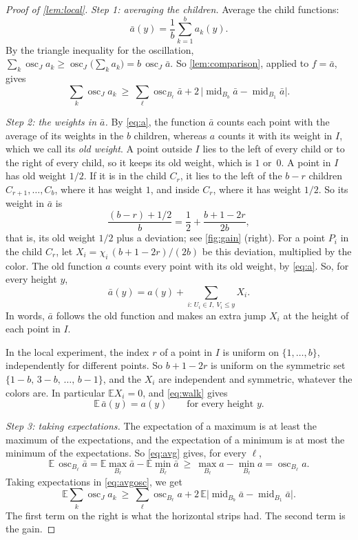\documentclass[11pt,letterpaper]{article}
\newcommand{\E}{\mathbb{E}}
\newcommand{\1}{\mathbf{1}}
\newcommand{\osc}{\operatorname{osc}}
\newcommand{\midp}{\operatorname{mid}}
\begin{document}
\begin{proof}[Proof of \cref{lem:local}]
\emph{Step 1: averaging the children.} Average the child functions:
\[
\bar a(y)=\frac1b\sum_{k=1}^ba_k(y).
\]
By the triangle inequality for the oscillation, $\sum_k\osc_Ja_k\ge\osc_J\bigl(\sum_ka_k\bigr)=b\,\osc_J\bar a$. So \cref{lem:comparison}, applied to $f=\bar a$, gives
\begin{equation}\label{eq:avgosc}
\sum_k\osc_Ja_k\ \ge\ \sum_\ell\osc_{B_\ell}\bar a+2\,\bigl|\midp_{B_b}\bar a-\midp_{B_1}\bar a\bigr|.
\end{equation}

\emph{Step 2: the weights in $\bar a$.} By \eqref{eq:a}, the function $\bar a$ counts each point with the average of its weights in the $b$ children, whereas $a$ counts it with its weight in $I$, which we call its \emph{old weight}. A point outside $I$ lies to the left of every child or to the right of every child, so it keeps its old weight, which is $1$ or~$0$. A point in $I$ has old weight $1/2$. If it is in the child $C_r$, it lies to the left of the $b-r$ children $C_{r+1},\dots,C_b$, where it has weight $1$, and inside $C_r$, where it has weight $1/2$. So its weight in $\bar a$ is
\[
\frac{(b-r)+1/2}b=\frac12+\frac{b+1-2r}{2b},
\]
that is, its old weight $1/2$ plus a deviation; see \cref{fig:gain} (right). For a point $P_i$ in the child $C_r$, let $X_i=\chi_i\,(b+1-2r)/(2b)$ be this deviation, multiplied by the color. The old function $a$ counts every point with its old weight, by \eqref{eq:a}. So, for every height $y$,
\begin{equation}\label{eq:walk}
\bar a(y)=a(y)+\sum_{i:\,U_i\in I,\ V_i\le y}X_i.
\end{equation}
In words, $\bar a$ follows the old function and makes an extra jump $X_i$ at the height of each point in $I$.

In the local experiment, the index $r$ of a point in $I$ is uniform on $\{1,\dots,b\}$, independently for different points. So $b+1-2r$ is uniform on the symmetric set $\{1-b,\,3-b,\,\dots,\,b-1\}$, and the $X_i$ are independent and symmetric, whatever the colors are. In particular $\E X_i=0$, and \eqref{eq:walk} gives
\begin{equation}\label{eq:avg}
\E\,\bar a(y)=a(y)\qquad\text{for every height }y.
\end{equation}

\emph{Step 3: taking expectations.} The expectation of a maximum is at least the maximum of the expectations, and the expectation of a minimum is at most the minimum of the expectations. So \eqref{eq:avg} gives, for every $\ell$,
\[
\E\,\osc_{B_\ell}\bar a=\E\max_{B_\ell}\bar a-\E\min_{B_\ell}\bar a\ \ge\ \max_{B_\ell}a-\min_{B_\ell}a=\osc_{B_\ell}a.
\]
Taking expectations in \eqref{eq:avgosc}, we get
\begin{equation}\label{eq:gain}
\E\sum_k\osc_Ja_k\ \ge\ \sum_\ell\osc_{B_\ell}a+2\,\E\bigl|\midp_{B_b}\bar a-\midp_{B_1}\bar a\bigr|.
\end{equation}
The first term on the right is what the horizontal strips had. The second term is the gain.


\end{proof}
\end{document}
